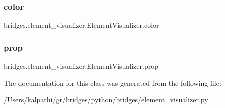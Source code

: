 \subsubsection{\texorpdfstring{color}{color}}
{\footnotesize\ttfamily bridges.\+element\+\_\+visualizer.\+Element\+Visualizer.\+color}

\mbox{\label{classbridges_1_1element__visualizer_1_1_element_visualizer_ac60ae1b3b3668b03dc4017e0ba4a199b}} 
\subsubsection{\texorpdfstring{prop}{prop}}
{\footnotesize\ttfamily bridges.\+element\+\_\+visualizer.\+Element\+Visualizer.\+prop}



The documentation for this class was generated from the following file\+:\begin{DoxyCompactItemize}
\item 
/\+Users/kalpathi/gr/bridges/python/bridges/\mbox{\hyperlink{element__visualizer_8py}{element\+\_\+visualizer.\+py}}\end{DoxyCompactItemize}
